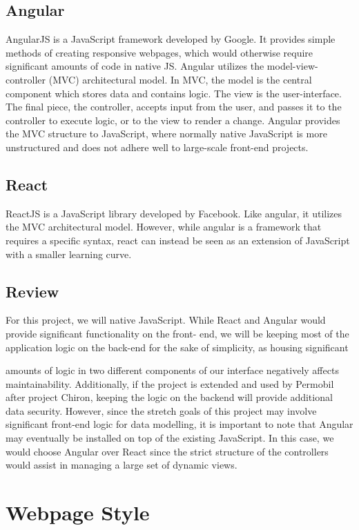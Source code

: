 \documentclass[onecolumn, draftclsnofoot,10pt, compsoc]{report}
\begin{document}
\subsection{Angular}
AngularJS is a JavaScript framework developed by Google. It provides simple methods of creating responsive webpages,
which would otherwise require significant amounts of code in native JS. Angular utilizes the model-view-controller
(MVC) architectural model. In MVC, the model is the central component which stores data and contains logic. The view
is the user-interface. The final piece, the controller, accepts input from the user, and passes it to the controller to execute
logic, or to the view to render a change. Angular provides the MVC structure to JavaScript, where normally native
JavaScript is more unstructured and does not adhere well to large-scale front-end projects.
\subsection{React}
ReactJS is a JavaScript library developed by Facebook. Like angular, it utilizes the MVC architectural model. However,
while angular is a framework that requires a specific syntax, react can instead be seen as an extension of JavaScript with
a smaller learning curve.
\subsection{Review}
For this project, we will native JavaScript. While React and Angular would provide significant functionality on the front-
end, we will be keeping most of the application logic on the back-end for the sake of simplicity, as housing significant

amounts of logic in two different components of our interface negatively affects maintainability. Additionally, if the
project is extended and used by Permobil after project Chiron, keeping the logic on the backend will provide additional
data security. However, since the stretch goals of this project may involve significant front-end logic for data modelling,
it is important to note that Angular may eventually be installed on top of the existing JavaScript. In this case, we would
choose Angular over React since the strict structure of the controllers would assist in managing a large set of dynamic
views.

\section{Webpage Style}
\end{document}
